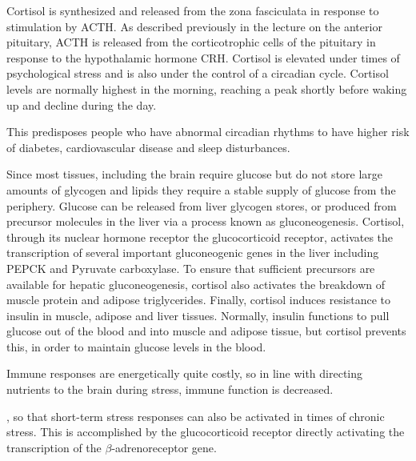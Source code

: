 \documentclass{tufte-handout}
\begin{document}
Cortisol is synthesized and released from the zona fasciculata in response to stimulation by ACTH.  As described previously in the lecture on the anterior pituitary, ACTH is released from the corticotrophic cells of the pituitary in response to the hypothalamic hormone CRH.  Cortisol is elevated under times of psychological stress and is also under the control of a circadian cycle.  Cortisol levels are normally highest in the morning, reaching a peak shortly before waking up and decline during the day.

  This predisposes people who have abnormal circadian rhythms to have higher risk of diabetes, cardiovascular disease and sleep disturbances\cite{Scheer2009,Pan2011}.

  Since most tissues, including the brain require glucose but do not store large amounts of glycogen and lipids they require a stable supply of glucose from the periphery.  Glucose can be released from liver glycogen stores, or produced from precursor molecules in the liver via a process known as gluconeogenesis.  Cortisol, through its nuclear hormone receptor the glucocorticoid receptor, activates the transcription of several important gluconeogenic genes in the liver including PEPCK and Pyruvate carboxylase.  To ensure that sufficient precursors are available for hepatic gluconeogenesis, cortisol also activates the breakdown of muscle protein and adipose triglycerides.  Finally, cortisol induces resistance to insulin in muscle, adipose and liver tissues.  Normally, insulin functions to pull glucose out of the blood and into muscle and adipose tissue, but cortisol prevents this, in order to maintain glucose levels in the blood.  

  Immune responses are energetically quite costly, so in line with directing nutrients to the brain during stress, immune function is decreased.

, so that short-term stress responses can also be activated in times of chronic stress.  This is accomplished by the glucocorticoid receptor directly activating the transcription of the $\beta$-adrenoreceptor gene\cite{Hadcock1988}.
\end{document}
